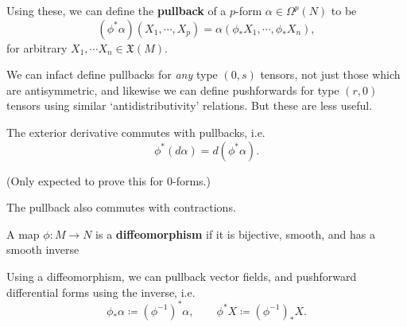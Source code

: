 \documentclass[12pt]{article}
\begin{document}
\begin{definition}
	Using these, we can define the \textbf{pullback} of a $p$-form $\alpha \in \Omega^p(N)$ to be
		\begin{equation}
			(\phi^* \alpha) (X_1, \cdots, X_p) = \alpha( \phi_* X_1, \cdots, \phi_* X_n),
		\end{equation}
	for arbitrary $X_1, \cdots X_n \in \mathfrak{X}(M)$.
\end{definition}
\begin{remark}
	We can infact define pullbacks for \textit{any} type $(0,s)$ tensors, not just those which are antisymmetric, and likewise we can define pushforwards for type $(r,0)$ tensors using similar `antidistributivity' relations. But these are less useful.
\end{remark}

\begin{lemma}
	The exterior derivative commutes with pullbacks, i.e.
		\begin{equation}
			\phi^* (d\alpha) = d(\phi^* \alpha).
		\end{equation}
\end{lemma}
(Only expected to prove this for $0$-forms.)
\begin{remark}
	The pullback also commutes with contractions.
\end{remark}

\begin{definition}[Diffeomorphism]
	A map $ \phi: M \to N$ is a \textbf{diffeomorphism} if it is bijective, smooth, and has a smooth inverse
\end{definition}

\begin{definition}
	Using a diffeomorphism, we can pullback vector fields, and pushforward differential forms using the inverse, i.e.
		\begin{equation}
			\phi_* \alpha \coloneqq \left(\phi^{-1}\right)^* \alpha, \qquad
			\phi^* X \coloneqq \left( \phi^{-1} \right)_* X.
		\end{equation}
\end{definition}
\end{document}
